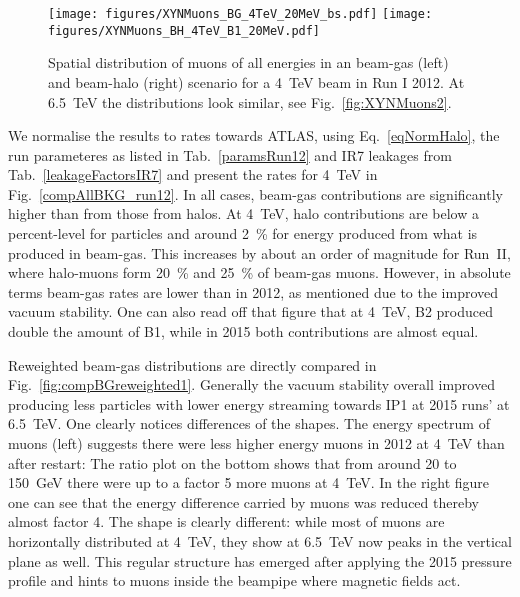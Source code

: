 \begin{figure} %
  \centering
  \texttt{[image: figures/XYNMuons\_BG\_4TeV\_20MeV\_bs.pdf]}
  \texttt{[image: figures/XYNMuons\_BH\_4TeV\_B1\_20MeV.pdf]}
  \caption{Spatial distribution of muons of all energies in an beam-gas (left) and beam-halo (right) scenario for a 4~TeV beam in Run I 2012. At 6.5~TeV the distributions look similar, see Fig.~\ref{fig:XYNMuons2}.
    \label{fig:XYNMuons}}
\end{figure}


We normalise the results to rates towards ATLAS, using Eq.~\ref{eqNormHalo}, the run parameteres as listed in Tab.~\ref{paramsRun12} and IR7 leakages from Tab.~\ref{leakageFactorsIR7} and present the rates for 4~TeV in Fig.~\ref{compAllBKG_run12}. In all cases, beam-gas contributions are significantly higher than from those from halos. At 4~TeV, halo contributions are below a percent-level for particles and around 2~\% for energy produced from what is produced in beam-gas. This increases by about an order of magnitude for Run~II, where halo-muons form 20~\% and 25~\% of beam-gas muons. However, in absolute terms beam-gas rates are lower than in 2012, as mentioned due to the improved vacuum stability. One can also read off that figure that at 4~TeV, B2 produced double the amount of B1, while in 2015 both contributions are almost equal.

Reweighted beam-gas distributions are directly compared in Fig.~\ref{fig:compBGreweighted1}. Generally the vacuum stability overall improved producing less particles with lower energy streaming towards IP1 at 2015 runs' at 6.5~TeV. One clearly notices differences of the shapes. The energy spectrum of muons (left) suggests there were less higher energy muons in 2012 at 4~TeV than after restart: The ratio plot on the bottom shows that from around 20 to 150~GeV there were up to a factor 5 more muons at 4~TeV. In the right figure one can see that the energy difference carried by muons was reduced thereby almost factor 4. The shape is clearly different: while most of muons are horizontally distributed at 4~TeV, they show at 6.5~TeV now peaks in the vertical plane as well. This regular structure has emerged after applying the 2015 pressure profile and hints to muons inside the beampipe where magnetic fields act.

